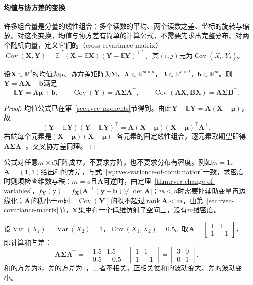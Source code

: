 \paragraph{均值与协方差的变换}
许多组合量是分量的线性组合：多个读数的平均、两个读数之差、坐标的旋转与缩放。对这类变换，均值与协方差有简单的计算公式，不需要先求出完整分布。对两个随机向量，定义它们的（cross-covariance matrix）$\operatorname{Cov}(\bm X,\bm Y)=\mathbb E[(\bm X-\mathbb E\bm X)(\bm Y-\mathbb E\bm Y)^{\top}]$，其$(i,j)$元为$\operatorname{Cov}(X_i,Y_j)$。

\begin{theorem}[仿射变换的均值与协方差]
\label{thm:rvec-affine-moments}
设$\bm X\in\mathbb R^d$的均值为$\bm\mu$、协方差矩阵为$\bm\Sigma$，$\bm A\in\mathbb R^{m\times d}$，$\bm B\in\mathbb R^{k\times d}$，$\bm b\in\mathbb R^m$。则$\bm Y=\bm A\bm X+\bm b$满足
\[
 \mathbb E\bm Y=\bm A\bm\mu+\bm b,\qquad \operatorname{Cov}(\bm Y)=\bm A\bm\Sigma\bm A^{\top},\qquad
 \operatorname{Cov}(\bm A\bm X,\bm B\bm X)=\bm A\bm\Sigma\bm B^{\top}.
\]
\end{theorem}

\begin{proof}
均值公式已在第~\ref{sec:rvec-moments}节得到。由此$\bm Y-\mathbb E\bm Y=\bm A(\bm X-\bm\mu)$，故
\[
 (\bm Y-\mathbb E\bm Y)(\bm Y-\mathbb E\bm Y)^{\top}=\bm A(\bm X-\bm\mu)(\bm X-\bm\mu)^{\top}\bm A^{\top}.
\]
右端每个元素是$(\bm X-\bm\mu)(\bm X-\bm\mu)^{\top}$各元素的固定线性组合，逐元素取期望即得$\bm A\bm\Sigma\bm A^{\top}$。交叉协方差同理。
\end{proof}

公式对任意$m\times d$矩阵成立，不要求方阵，也不要求分布有密度。例如$m=1$、$\bm A=(1,1)$给出和的方差，与式~\eqref{eq:rvec-variance-of-combination}一致。求密度时则须检查维数与秩：$m=d$且$\bm A$可逆时，由定理~\ref{thm:rvec-change-of-variables}，$f_{\bm Y}(\bm y)=f_{\bm X}\bigl(\bm A^{-1}(\bm y-\bm b)\bigr)/|\det\bm A|$；$m<d$时需要补辅助变量再边缘化；$\bm A$的秩小于$m$时，$\operatorname{Cov}(\bm Y)$的秩不超过$\operatorname{rank}\bm A<m$，由第~\ref{sec:rvec-covariance-matrix}节，$\bm Y$集中在一个低维仿射子空间上，没有$m$维密度。

\begin{example}[和与差]
\label{ex:rvec-sum-difference}
设$\operatorname{Var}(X_1)=\operatorname{Var}(X_2)=1$，$\operatorname{Cov}(X_1,X_2)=0.5$。取$\bm A=\begin{bmatrix}1&1\\1&-1\end{bmatrix}$，即计算和与差：
\[
 \bm A\bm\Sigma\bm A^{\top}=\begin{bmatrix}1.5&1.5\\0.5&-0.5\end{bmatrix}\begin{bmatrix}1&1\\1&-1\end{bmatrix}=\begin{bmatrix}3&0\\0&1\end{bmatrix}.
\]
和的方差为$3$，差的方差为$1$，二者不相关。正相关使和的波动变大、差的波动变小。
\end{example}

